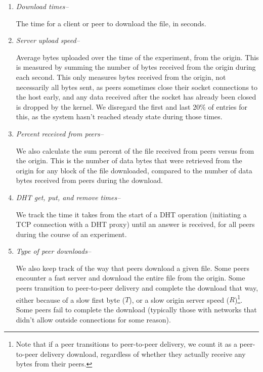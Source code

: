 \begin{enumerate}

\item \emph{Download times--}

The time for a client or peer to download the file, in seconds.

\item \emph{Server upload speed--}

Average bytes uploaded over the time of the experiment, from the origin.
This is measured by summing the number of bytes received from the origin during each second.  
This only measures bytes received from the origin, not necessarily all bytes sent, 
as peers sometimes close their socket connections to the host early, and any data received after the socket has already been closed is dropped by the kernel.  
We disregard the first and last 20\% of entries for this, as the system hasn't reached steady state during those times.

\item \emph{Percent received from peers--}

We also calculate the sum percent of the file received from peers versus from the origin.  This is the number of data bytes that were retrieved
from the origin for any block of the file downloaded, compared to the number of data bytes received from peers during the download.

\item \emph{DHT get, put, and remove times--}

We track the time it takes from the start of a DHT operation (initiating a TCP connection with a DHT proxy) 
until an answer is received, for all peers during the course of an experiment.

\item \emph{Type of peer downloads--}

We also keep track of the way that peers download a given file.  Some peers encounter a fast server and download the entire file from the origin.
Some peers transition to peer-to-peer delivery and complete the download that way, either because of a slow first byte ($T$), 
or a slow origin server speed ($R$)\footnote{Note that if a peer transitions to peer-to-peer delivery, we count it as
a peer-to-peer delivery download, regardless of whether they actually receive any bytes from their peers.}.  Some peers 
fail to complete the download (typically those with networks that didn't allow outside connections for some reason).

\end{enumerate}

